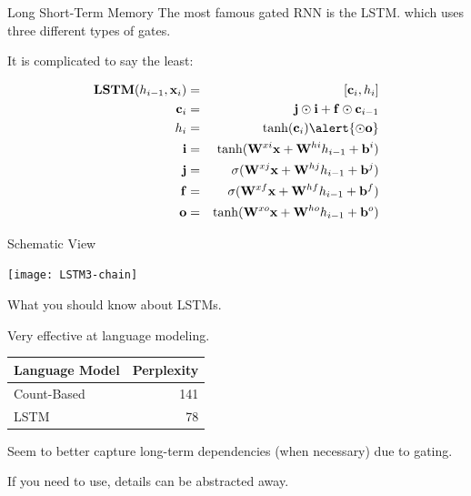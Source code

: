 \documentclass{beamer}
\let\tempone\itemize
\let\temptwo\enditemize
\renewenvironment{itemize}{\tempone\addtolength{\itemsep}{0.5\baselineskip}}{\temptwo}
\newcommand{\air}{\vspace{0.25cm}}
\newcommand{\boldx}{\mathbf{x}}
\newcommand{\boldb}{\mathbf{b}}
\newcommand{\boldW}{\mathbf{W}}
\begin{document}
\begin{frame}{Long Short-Term Memory}
  The most famous gated RNN is the LSTM. which uses three different 
  types of gates.
\air

  It is complicated to say the least: 

    \begin{eqnarray*}
      \textbf{LSTM}(h_{i-1}, \boldx_i) &=& [\mathbf{c}_i, h_i]  \\
      \mathbf{c}_i &=& \mathbf{j} \odot \mathbf{i}  + \mathbf{ f} \odot \mathbf{ c}_{i-1}    \\
      h_i &=& \tanh(\mathbf{c}_i) \alert{\odot \mathbf{o}}\\ 
      \mathbf{i} &=& \tanh(\boldW^{xi}\boldx  + \boldW^{hi} h_{i-1} + \boldb^i) \\
      \mathbf{j} &=& \sigma(\boldW^{xj} \boldx  + \boldW^{hj} h_{i-1} + \boldb^j) \\
      \mathbf{f} &=& \sigma(\boldW^{xf}\boldx  + \boldW^{hf}h_{i-1} + \boldb^f) \\
      \mathbf{o} &=& \tanh(\boldW^{xo} \boldx  + \boldW^{ho} h_{i-1} + \boldb^o) \\
    \end{eqnarray*}

\end{frame}


\begin{frame}{Schematic View}
  \begin{center}
    \texttt{[image: LSTM3-chain]}
  \end{center}
\end{frame}


\begin{frame}{What you should know about LSTMs.}

  \begin{itemize}
  \item  Very effective at language modeling.
    \begin{center}
      \begin{tabular}{lr}
        \toprule
        Language Model & Perplexity \\
        \midrule
        Count-Based &  141 \\    
        LSTM &  78 \\
        \bottomrule
      \end{tabular}
    \end{center}
    \air
    
  \item Seem to better capture long-term dependencies (when necessary) due to gating. 
    \air
  \item If you need to use, details can be abstracted away.
    \begin{center}
    \end{center}
  \end{itemize}
\end{frame}
\end{document}
